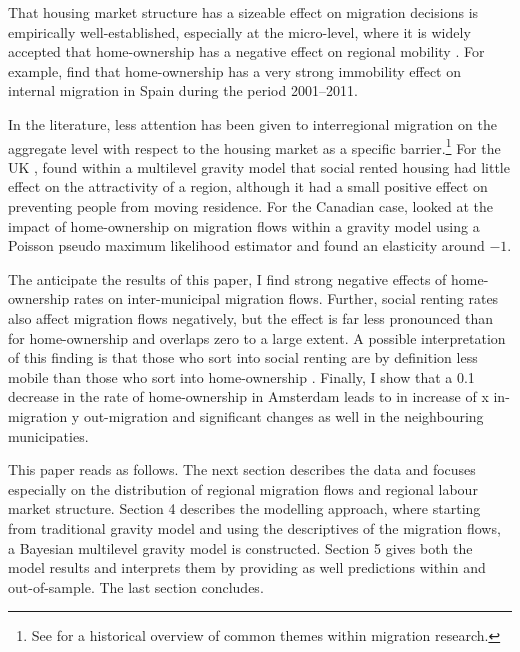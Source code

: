 \documentclass[fleqn,10pt]{SelfArx} %
\begin{document}
        That housing market structure has a sizeable effect on migration
        decisions is empirically well-established, especially at the micro-level,
        where it is widely accepted that home-ownership has a negative
        effect on regional mobility \citep{dietz2003social, dohmen2005housing}. For
        example, \citet{palomares2018understanding} find that
        home-ownership has a very strong immobility effect on
        internal migration in Spain during the period 2001--2011.
        
        In the literature, less attention has been given to interregional migration on the aggregate level with respect to the housing market as a specific barrier.\footnote{See \citet{cushing2004crossing} for a historical overview of common themes within migration research.} For the UK , \citet{congdon2010random} found within a multilevel gravity model that social rented housing had little effect on the attractivity of a region, although it had a small positive effect on preventing people from moving residence. For the Canadian case, \citet{amirault2016drags} looked at the impact of home-ownership on migration flows within a gravity model using a Poisson pseudo maximum likelihood estimator and found an elasticity around $-1$. 

		The anticipate the results of this paper, I find strong negative effects of home-ownership rates on inter-municipal migration flows. Further, social renting rates also affect migration flows negatively, but the effect is far less pronounced than for home-ownership and overlaps zero to a large extent. A possible interpretation of this finding is that those who sort into social renting are by definition less mobile than those who sort into home-ownership \citep[this argument is put forward by][as well]{boyle1998migration}. Finally, I show that a 0.1 decrease in the rate of home-ownership in Amsterdam leads to in increase of x in-migration y out-migration and significant changes as well in the neighbouring municipaties. 

        This paper reads as follows. The next section describes the
        data and focuses especially on the distribution of regional
        migration flows and regional labour market structure. Section
        4 describes the modelling approach, where starting from
        traditional gravity model and using the descriptives of the
        migration flows, a Bayesian multilevel gravity model is constructed. Section
        5 gives both the model results and interprets them by providing as well predictions within and
        out-of-sample. The last section concludes.
\end{document}
